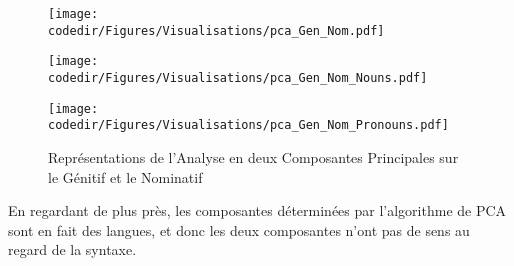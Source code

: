 \documentclass{cours}
\newcommand{\codedir}{Morphosyntactic-Categories_Code}
\begin{document}
\begin{figure}[H]
    \begin{center}
        \begin{minipage}{.5\textwidth}
            \begin{center}
                \texttt{[image: \\codedir/Figures/Visualisations/pca\_Gen\_Nom.pdf]}
            \end{center}
        \end{minipage}
    \end{center}
    \begin{minipage}{.5\textwidth}
        \begin{center}
            \texttt{[image: \\codedir/Figures/Visualisations/pca\_Gen\_Nom\_Nouns.pdf]}
        \end{center}
    \end{minipage}
    \begin{minipage}{.5\textwidth}
        \begin{center}
            \texttt{[image: \\codedir/Figures/Visualisations/pca\_Gen\_Nom\_Pronouns.pdf]}
        \end{center}
    \end{minipage}
    \caption{Représentations de l'Analyse en deux Composantes Principales sur le Génitif et le Nominatif}
\end{figure}

En regardant de plus près, les composantes déterminées par l'algorithme de PCA sont en fait des langues, et donc les deux composantes n'ont pas de sens au regard de la syntaxe.
\end{document}
